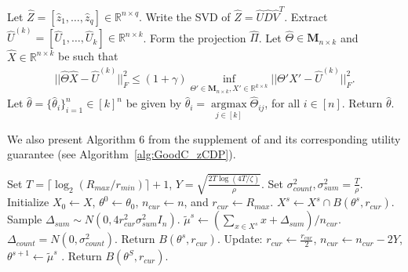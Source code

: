\documentclass{article}
\begin{document}
\begin{algorithm}[h!]
\begin{algorithmic}[1]
    \State Let $\hat{Z} = [\hat{z}_1, \dots, \hat{z}_q] \in \mathbb{R}^{n \times q}$. Write the SVD of $\hat{Z} = \hat{U}\hat{D}\hat{V}^T$. 
    Extract $\hat{U}^{(k)} = [\hat{U}_1, \dots, \hat{U}_k] \in \mathbb{R}^{n \times k}$. Form the projection $\hat{\Pi}$. 
    \State Let $\hat{\Theta} \in \mathbf{M}_{n\times k}$ and $\hat{X} \in \mathbb{R}^{n \times k}$ be such that 
    \begin{align*}
        ||\hat{\Theta}\hat{X} - \hat{U}^{(k)}||_F^2 \leq (1 + \gamma)\mathop{\inf}\limits_{\Theta' \in \mathbf{M}_{n\times k}, X' \in \mathbb{R}^{k \times k}}||\Theta'X' - \hat{U}^{(k)}||_F^2.
    \end{align*}
    \State Let $\hat{\theta} = \{\hat{\theta}_i\}_{i = 1}^n \in [k]^n$ be given by $\hat{\theta}_i = \mathop{\arg\max}\limits_{j \in [k]}\hat{\Theta}_{ij}$, for all $i \in [n]$.
    \State Return $\hat{\theta}$.
\EndFunction
\end{algorithmic}
\end{algorithm}

We also present Algorithm 6 from the supplement of \cite{mahpud2022differentially} and its corresponding utility guarantee (see Algorithm~\ref{alg:GoodC_zCDP}).

\begin{algorithm}[h!]
\caption{Noisy Average and Radius (GoodCenter)}
\label{alg:GoodC_zCDP}
\begin{algorithmic}[1]
\State Set $T = \lceil\log_2(R_{max}/r_{min})\rceil + 1$, $Y = \sqrt{\frac{2T\log(4T/\zeta)}{\rho}}$.
\State Set $\sigma_{count}^2, \sigma_{sum}^2 = \frac{T}{\rho}$.
\State Initialize $X_0 \leftarrow X$, $\theta^0 \leftarrow \theta_0$, $n_{cur} \leftarrow n$, and $r_{cur} \leftarrow R_{max}$.
    \State $X^s \leftarrow X^s \cap B(\theta^s, r_{cur})$.
    \State Sample $\Delta_{sum} \sim N(0, 4r_{cur}^2\sigma_{sum}^2I_n)$.
    \State $\tilde{\mu}^s \leftarrow \left(\mathop{\sum}\limits_{x \in X^s} x + \Delta_{sum}\right)/n_{cur}$.
    \State $\Delta_{count} = N(0, \sigma_{count}^2)$.
    \State Return $B(\theta^s, r_{cur})$.
    \EndIf
    \State Update: $r_{cur} \leftarrow \frac{r_{cur}}{2}$, $n_{cur} \leftarrow n_{cur} - 2Y$, $\theta^{s + 1} \leftarrow \tilde{\mu}^s$ .
    \EndFor
\State Return $B(\theta^S, r_{cur})$.
\EndFunction
\end{algorithmic}
\end{algorithm}
\end{document}
